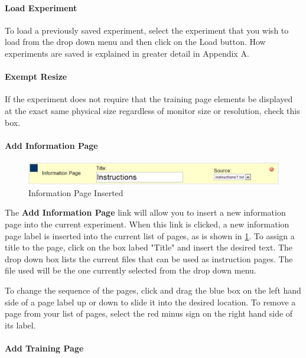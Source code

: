 \documentclass[article]{ij4uq}              %
\begin{document}
\paragraph{Load Experiment}
To load a previously saved experiment, select the experiment that you wish to load from the drop down menu and then click on the Load button.  How experiments are saved is explained in greater detail in Appendix A.

\paragraph{Exempt Resize}
If the experiment does not require that the training page elements be displayed at the exact same physical size regardless of monitor size or resolution, check this box.

\paragraph{Add Information Page}

\begin{figure}[h!]
 \centering
 \includegraphics[width=5.0in]{figures/add_instruction.png}
 \caption{Information Page Inserted}
 \label{fig:infoInsert}
\end{figure}
\FloatBarrier

The \textbf{Add Information Page} link will allow you to insert a new information page into the current experiment. When this link is clicked, a new information page label is inserted into the current list of pages, as is shown in \ref{fig:infoInsert}.  To assign a title to the page, click on the box labed "Title" and insert the desired text.  The drop down box lists the current files that can be used as instruction pages.  The file used will be the one currently selected from the drop down menu.

To change the sequence of the pages, click and drag the blue box on the left hand side of a page label up or down to slide it into the desired location. To remove a page from your list of pages, select the red minus sign on the right hand side of its label.

\paragraph{Add Training Page}
\end{document}
